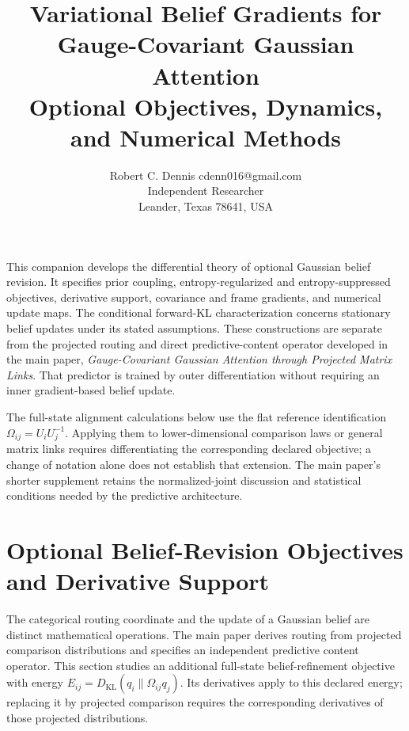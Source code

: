 \documentclass[twoside,11pt]{article}
\begin{document}

\title{Variational Belief Gradients for Gauge-Covariant Gaussian Attention\\[6pt]
\large Optional Objectives, Dynamics, and Numerical Methods}

\author{\name Robert C. Dennis \email cdenn016@gmail.com \\
  \addr Independent Researcher\\
  \addr Leander, Texas 78641, USA}


\maketitle


This companion develops the differential theory of optional Gaussian belief revision. It specifies prior coupling, entropy-regularized and entropy-suppressed objectives, derivative support, covariance and frame gradients, and numerical update maps. The conditional forward-KL characterization concerns stationary belief updates under its stated assumptions. These constructions are separate from the projected routing and direct predictive-content operator developed in the main paper, \emph{Gauge-Covariant Gaussian Attention through Projected Matrix Links}. That predictor is trained by outer differentiation without requiring an inner gradient-based belief update.

The full-state alignment calculations below use the flat reference identification \(\Omega_{ij}=U_iU_j^{-1}\). Applying them to lower-dimensional comparison laws or general matrix links requires differentiating the corresponding declared objective; a change of notation alone does not establish that extension. The main paper's shorter supplement retains the normalized-joint discussion and statistical conditions needed by the predictive architecture.

\renewcommand{\theequation}{G\arabic{equation}}
\renewcommand{\thefigure}{G\arabic{figure}}
\renewcommand{\thetable}{G\arabic{table}}

\section{Optional Belief-Revision Objectives and Derivative Support}
\label{app:optional_belief_revision}

The categorical routing coordinate and the update of a Gaussian belief are distinct mathematical operations. The main paper derives routing from projected comparison distributions and specifies an independent predictive content operator. This section studies an additional full-state belief-refinement objective with energy $E_{ij}=D_{\mathrm{KL}}(q_i\|\Omega_{ij}q_j)$. Its derivatives apply to this declared energy; replacing it by projected comparison requires the corresponding derivatives of those projected distributions.
\end{document}
